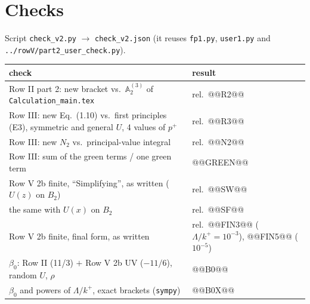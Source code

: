 \documentclass[10pt]{article}
\numberwithin{equation}{section}
\def\mf#1{\mathbb{#1}}
\begin{document}
\section{Checks}
Script \texttt{check\_v2.py} $\to$ \texttt{check\_v2.json} (it reuses \texttt{fp1.py}, \texttt{user1.py} and \texttt{../rowV/part2\_user\_check.py}).
\begin{center}\small
\begin{tabular}{@{}p{}p{}@{}}\toprule
check & result\\\midrule
Row II part 2: new bracket vs.\ $\mf A^{(3)}_2$ of \texttt{Calculation\_main.tex} & rel.\ @@R2@@\\
Row III: new Eq.~(1.10) vs.\ first principles (E3), symmetric and general $U$, 4 values of $p^+$ & rel.\ @@R3@@\\
Row III: new $N_2$ vs.\ principal-value integral & rel.\ @@N2@@\\
Row III: sum of the green terms / one green term & @@GREEN@@\\
Row V 2b finite, ``Simplifying'', as written ($U(z)$ on $B_2$) & rel.\ @@SW@@\\
\quad the same with $U(x)$ on $B_2$ & rel.\ @@SF@@\\
Row V 2b finite, final form, as written & rel.\ @@FIN3@@ ($\Lambda/k^+=10^{-3}$), @@FIN5@@ ($10^{-5}$)\\
$\beta_0$: Row II (11/3) $+$ Row V 2b UV ($-11/6$), random $U$, $\rho$ & @@B0@@\\
$\beta_0$ and powers of $\Lambda/k^+$, exact brackets (\texttt{sympy}) & @@B0X@@\\\bottomrule
\end{tabular}
\end{center}
\end{document}
